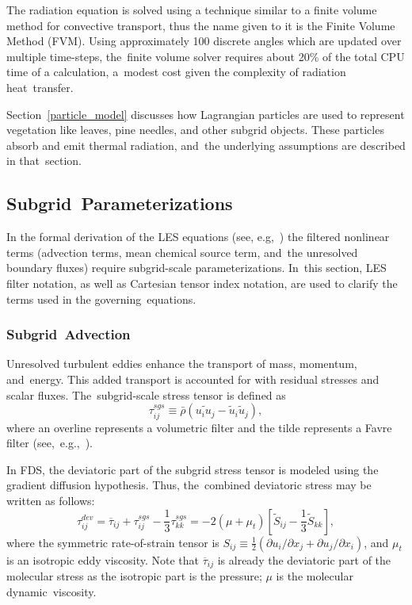 \documentclass[atmosphere,article,accept,moreauthors,pdftex]{Definitions/mdpi}
\begin{document}
The radiation equation is solved using a technique similar to a finite volume method for convective transport, thus the name given to it is the Finite Volume Method (FVM). Using approximately 100 discrete angles which are updated over multiple time-steps, the~finite volume solver requires about 20\% of the total CPU time of a calculation, a~modest cost given the complexity of radiation heat~transfer.

Section~\ref{particle_model} discusses how Lagrangian particles are used to represent vegetation like leaves, pine needles, and other subgrid objects. These particles absorb and emit thermal radiation, and~the underlying assumptions are described in that~section.

\subsection{Subgrid~Parameterizations} \label{sec:subgrid}

In the formal derivation of the LES equations (see, e.g,~\cite{Pope:2000,FDS_Tech_Guide}) the filtered nonlinear terms (advection terms, mean chemical source term, and~the unresolved boundary fluxes) require subgrid-scale parameterizations.  In~this section, LES filter notation, as well as Cartesian tensor index notation, are used to clarify the terms used in the governing~equations.

\subsubsection{Subgrid~Advection}

Unresolved turbulent eddies enhance the transport of mass, momentum, and~energy.  This added transport is accounted for with residual stresses and scalar fluxes.  The~subgrid-scale stress tensor is defined as
\begin{equation}
\tau_{ij}^{sgs} \equiv \bar{\rho}(\widetilde{u_i u_j} - \tilde{u}_i \tilde{u}_j),
\end{equation}
where an overline represents a volumetric filter and the tilde represents a Favre filter (\mbox{see, e.g.,~\cite{Poinsot:TNC}}).

In FDS, the deviatoric part of the subgrid stress tensor is modeled using the gradient diffusion hypothesis.  Thus, the~combined deviatoric stress may be written as follows:
\begin{equation}
\tau_{ij}^{dev} = \overline{\tau}_{ij} + \tau_{ij}^{sgs} - \frac{1}{3} \tau_{kk}^{sgs} = -2 (\mu + \mu_t) \left[ \tilde{S}_{ij} - \frac{1}{3} \tilde{S}_{kk} \right],
\end{equation}
where the symmetric rate-of-strain tensor is $S_{ij} \equiv \frac{1}{2}(\partial u_i/\partial x_j + \partial u_j/\partial x_i)$, and $\mu_t$ is an isotropic eddy viscosity.  Note that $\overline{\tau}_{ij}$ is already the deviatoric part of the molecular stress as the isotropic part is the pressure; $\mu$ is the molecular dynamic~viscosity.
\end{document}
